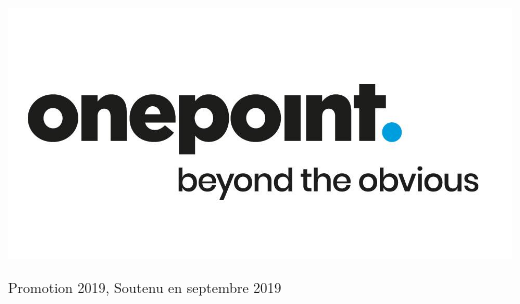 \begin{titlepage}
\includegraphics[scale=0.15]{img/onepoint.jpg}\\[1cm] 

\begin{flushright} \large 
	Promotion 2019, Soutenu en septembre 2019
\end{flushright}

\vfill %

\end{titlepage}